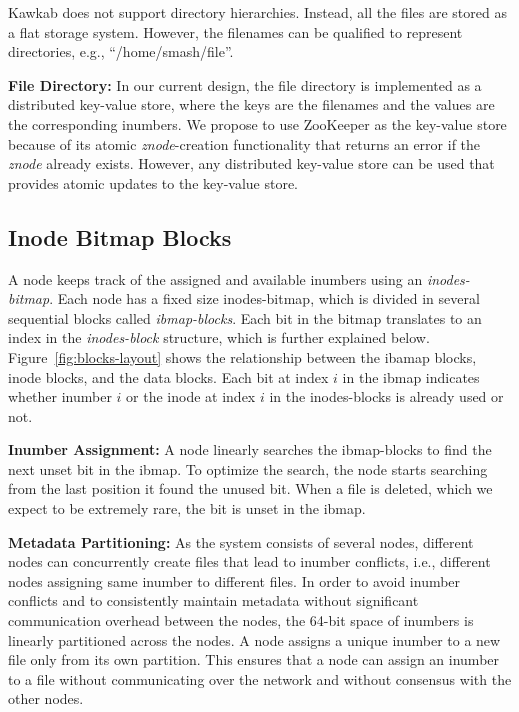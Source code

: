 \documentclass[]{article}
\newcommand{\subtopic}[1]{\vspace{1.5pt} \noindent \textbf{#1}}
\begin{document}
Kawkab does not support directory hierarchies. Instead, all the files are stored
as a flat storage system. However, the filenames can be qualified to represent
directories, e.g., ``/home/smash/file''.

\subtopic{File Directory:}
In our current design, the file directory is implemented as a distributed
key-value store, where the keys are the filenames and the values are the corresponding
inumbers. We propose to use ZooKeeper as the key-value store because of its
atomic \textit{znode}-creation functionality that returns an error if
the \textit{znode} already exists. However, any distributed key-value store can be used 
that provides atomic updates to the key-value store.


\subsection{Inode Bitmap Blocks}
A node keeps track of the assigned and available inumbers using an \textit{inodes-bitmap}.
Each node has a fixed size inodes-bitmap, which is divided in several sequential blocks
called \textit{ibmap-blocks}. Each bit in the bitmap translates to an index in the
\textit{inodes-block} structure, which is further explained below.
Figure~\ref{fig:blocks-layout} shows the relationship between the ibamap blocks, 
inode blocks, and the data blocks. Each bit at index $i$ in the
ibmap indicates whether inumber $i$ or the inode at index $i$ in the inodes-blocks
is already used or not.

\subtopic{Inumber Assignment:}
A node linearly searches the ibmap-blocks to find the next unset bit in the ibmap.
To optimize the search, the node starts searching from the last position it
found the unused bit. When a file is deleted, which we expect to be extremely
rare, the bit is unset in the ibmap.



\subtopic{Metadata Partitioning:} As the system consists of several nodes,
different nodes can concurrently create files that lead to inumber conflicts,
i.e., different nodes assigning same inumber to different files.  In order to
avoid inumber conflicts and to  consistently maintain metadata without
significant communication overhead between the nodes, the 64-bit space of
inumbers is linearly partitioned across the nodes. A node assigns a unique
inumber to a new file only from its own partition. This ensures that a node can
assign an inumber to a file without communicating over the network and without
consensus with the other nodes.
\end{document}
